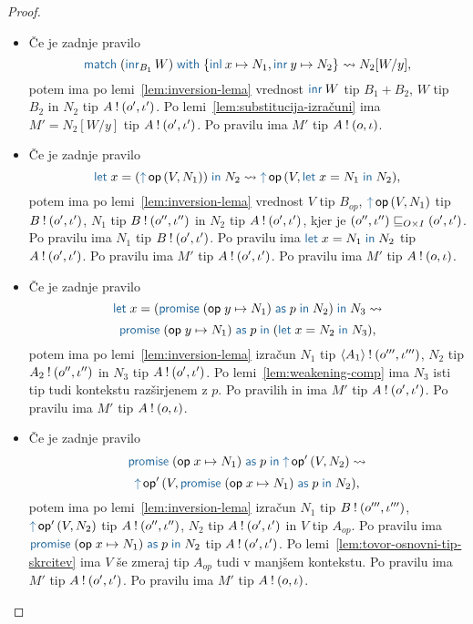 \begin{proof}
\begin{itemize}
		\item Če je zadnje pravilo $$\tmmatch{(\tminr[B_1]{W})}{\tminl{x} \mapsto N_1, \tminr{y} \mapsto N_2} \reduces N_2[W/y],$$ potem ima po lemi~\ref{lem:inversion-lema} vrednost $\tminr{W}$ tip $B_1 + B_2$, $W$ tip $B_2$ in $N_2$ tip $A \mathbin{!} (o', \iota')$.
		Po lemi~\ref{lem:substitucija-izračuni} ima $M' = N_2[W/y]$ tip $A \mathbin{!} (o', \iota')$.
		Po pravilu  ima $M'$ tip $A \mathbin{!} (o, \iota)$.
		
		\item Če je zadnje pravilo $$\tmlet{x}{(\tmopout{op}{V}{N_1})}{N_2} \reduces \tmopout{op}{V}{\tmlet{x}{N_1}{N_2}},$$ potem ima po lemi~\ref{lem:inversion-lema} vrednost $V$ tip $B_{op}$, $\tmopout{op}{V}{N_1}$ tip $B \mathbin{!} (o', \iota')$, $N_1$ tip $B \mathbin{!} (o'', \iota'')$ in $N_2$ tip $A \mathbin{!} (o', \iota')$, kjer je $(o'', \iota'') \sqsubseteq_{O \times I} (o', \iota')$.
		Po pravilu  ima $N_1$ tip $B \mathbin{!} (o', \iota')$.
		Po pravilu  ima $\tmlet{x}{N_1}{N_2}$ tip $A \mathbin{!} (o', \iota')$.
		Po pravilu  ima $M'$ tip $A \mathbin{!} (o', \iota')$.
		Po pravilu  ima $M'$ tip $A \mathbin{!} (o, \iota)$.
		
		\item Če je zadnje pravilo $$\tmlet{x}{(\tmwith{op}{y}{N_1}{p}{N_2})}{N_3} \reduces$$ $$ \tmwith{op}{y}{N_1}{p}{(\tmlet{x}{N_2}{N_3})},$$ potem ima po lemi~\ref{lem:inversion-lema} izračun $N_1$ tip $\langle A_1 \rangle \mathbin{!} (o''', \iota''')$, $N_2$ tip $A_2 \mathbin{!} (o'', \iota'')$ in $N_3$ tip $A \mathbin{!} (o', \iota')$.
		Po lemi~\ref{lem:weakening-comp} ima $N_3$ isti tip tudi kontekstu razširjenem z $p$.
		Po pravilih  in  ima $M'$ tip $A \mathbin{!} (o', \iota')$.
		Po pravilu  ima $M'$ tip $A \mathbin{!} (o, \iota)$.
		
		\item Če je zadnje pravilo $$\tmwith{op}{x}{N_1}{p}{\tmopout{op'}{V}{N_2}} \reduces$$ $$ \tmopout{op'}{V}{\tmwith{op}{x}{N_1}{p}{N_2}},$$ potem ima po lemi~\ref{lem:inversion-lema} izračun $N_1$ tip $B \mathbin{!} (o''', \iota''')$, $\tmopout{op'}{V}{N_2}$ tip $A \mathbin{!} (o'', \iota'')$, $N_2$ tip $A \mathbin{!} (o', \iota')$ in $V$ tip $A_{op}$.
		Po pravilu  ima $\tmwith{op}{x}{N_1}{p}{N_2}$ tip $A \mathbin{!} (o', \iota')$.
		Po lemi~\ref{lem:tovor-osnovni-tip-skrcitev} ima $V$ še zmeraj tip $A_{op}$ tudi v manjšem kontekstu. Po pravilu  ima $M'$ tip $A \mathbin{!} (o', \iota')$.
		Po pravilu  ima $M'$ tip $A \mathbin{!} (o, \iota)$.
		

\end{itemize}
\end{proof}
